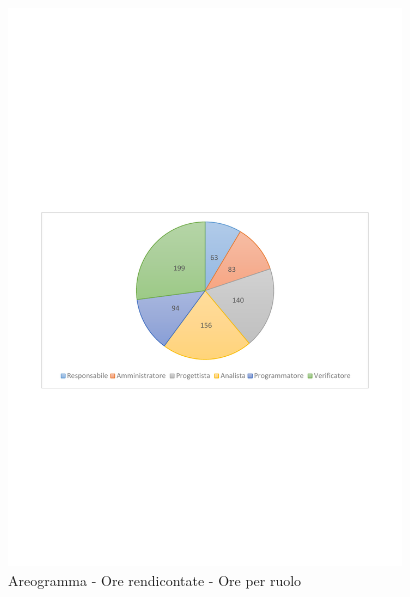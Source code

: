 \documentclass[../PianoProgetto.tex]{subfiles}
\begin{document}
	\begin{figure}[!h]
		\centering
		\includegraphics[width=0.93\textwidth , trim=2cm 9.5cm 2cm 11cm]{grafici/Riepilogo/Rendicontate/ore-ruolo}
			\caption{Areogramma - Ore rendicontate - Ore per ruolo}
		\label{fig:CircleChart-rendicontate_ore_r}
	\end{figure}
\vfill			
\end{document}
